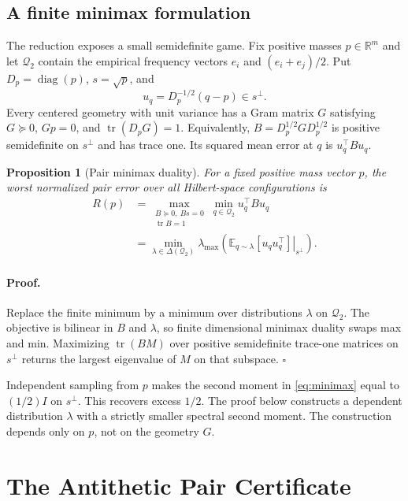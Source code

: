 \documentclass[twoside]{article}
\newtheorem{proposition}[theorem]{Proposition}
\newcommand{\R}{\mathbb R}
\newcommand{\E}{\mathbb E}
\begin{document}
\subsection{A finite minimax formulation}

The reduction exposes a small semidefinite game. Fix positive masses $p\in\R^m$ and let $\mathcal Q_2$ contain the empirical frequency vectors $e_i$ and $(e_i+e_j)/2$. Put $D_p=\operatorname{diag}(p)$, $s=\sqrt p$, and \[ u_q=D_p^{-1/2}(q-p)\in s^\perp. \] Every centered geometry with unit variance has a Gram matrix $G$ satisfying $G\succeq0$, $Gp=0$, and $\operatorname{tr}(D_pG)=1$. Equivalently, $B=D_p^{1/2}GD_p^{1/2}$ is positive semidefinite on $s^\perp$ and has trace one. Its squared mean error at $q$ is $u_q^\top B u_q$.

\begin{proposition}[Pair minimax duality]\label{prop:minimax}
For a fixed positive mass vector $p$, the worst normalized pair error over all Hilbert-space configurations is
\begin{align}\label{eq:minimax}
 R(p)
 &=\max_{\substack{B\succeq0,\ Bs=0\\\operatorname{tr}B=1}}
     \min_{q\in\mathcal Q_2}u_q^\top Bu_q\\
 &=\min_{\lambda\in\Delta(\mathcal Q_2)}
   \lambda_{\max}\left(
   \left.\E_{q\sim\lambda}[u_qu_q^\top]\right|_{s^\perp}
   \right).
\end{align}
\end{proposition}

\paragraph{Proof.}
Replace the finite minimum by a minimum over distributions $\lambda$ on $\mathcal Q_2$. The objective is bilinear in $B$ and $\lambda$, so finite dimensional minimax duality swaps max and min. Maximizing $\operatorname{tr}(BM)$ over positive semidefinite trace-one matrices on $s^\perp$ returns the largest eigenvalue of $M$ on that subspace. \hfill$\square$

Independent sampling from $p$ makes the second moment in \eqref{eq:minimax} equal to $(1/2)I$ on $s^\perp$. This recovers excess $1/2$. The proof below constructs a dependent distribution $\lambda$ with a strictly smaller spectral second moment. The construction depends only on $p$, not on the geometry $G$.

\section{The Antithetic Pair Certificate}\label{sec:certificate}
\end{document}
